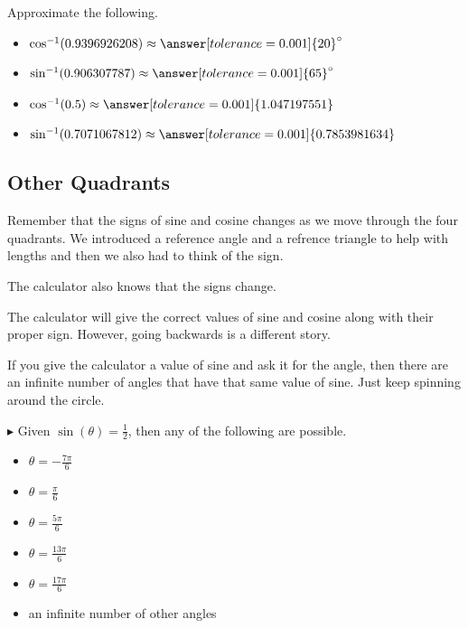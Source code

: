 \documentclass{ximera}
\begin{document}
\begin{question} 


Approximate the following.

\begin{itemize}
\item $\cos^{-1}(0.9396926208) \approx \answer[tolerance=0.001]{20}^{\circ}$
\item $\sin^{-1}(0.906307787) \approx \answer[tolerance=0.001]{65}^{\circ}$
\item $\cos^{-1}(0.5) \approx \answer[tolerance=0.001]{1.047197551}$
\item $\sin^{-1}(0.7071067812) \approx \answer[tolerance=0.001]{0.7853981634}$
\end{itemize}

\end{question}




\subsection*{Other Quadrants}

Remember that the signs of sine and cosine changes as we move through the four quadrants.  We introduced a reference angle and a refrence triangle to help with lengths and then we also had to think of the sign. 

The calculator also knows that the signs change. 

The calculator will give the correct values of sine and cosine along with their proper sign.  However, going backwards is a different story. 

If you give the calculator a value of sine and ask it for the angle, then there are an infinite number of angles that have that same value of sine.  Just keep spinning around the circle. 



\begin{example}

$\blacktriangleright$ Given  $\sin(\theta) = \frac{1}{2}$, then any of the following are possible.


\begin{itemize}
\item $\theta = -\frac{7\pi}{6}$
\item $\theta = \frac{\pi}{6}$
\item $\theta = \frac{5\pi}{6}$
\item $\theta = \frac{13\pi}{6}$
\item $\theta = \frac{17\pi}{6}$
\item an infinite number of other angles
\end{itemize}


\end{example}
\end{document}
